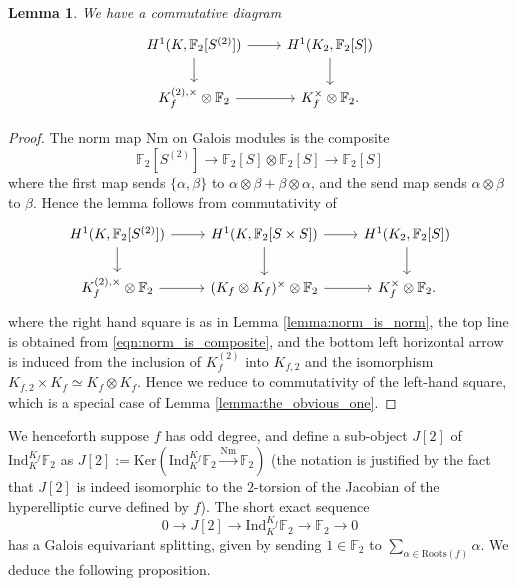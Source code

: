 \documentclass[11pt]{amsart}
\def\F{\mathbb F}
\theoremstyle{plain}
\newtheorem{lemma}{Lemma}
\theoremstyle{definition}
\newcommand{\Roots}{\mathrm{Roots}}
\newcommand{\Ind}{\mathrm{Ind}}
\newcommand{\Nm}{\mathrm{Nm}}
\newcommand{\Ker}{\mathrm{Ker}}
\begin{document}
\begin{lemma}\label{lemma:random}
We have a commutative diagram
\[
\begin{tikzcd}
H^1 (K ,\F _2 [S^{(2)}]) \arrow[r] \arrow[d] & H^1 (K_2 ,\F _2 [S]) \arrow[d] \\
K_f ^{(2),\times } \otimes \F _2  \arrow[r]           & K_{f}^\times \otimes \F _2 .          
\end{tikzcd}
\]
\end{lemma}
\begin{proof}
The norm map $\Nm$ on Galois modules is the composite 
\begin{equation}\label{eqn:norm_is_composite}
\F _2 [S^{(2)}]\to \F _2 [S ]\otimes \F _2 [S] \to \F _2 [S]
\end{equation}
where the first map sends $\{\alpha ,\beta \}$ to $\alpha \otimes \beta +\beta \otimes \alpha $, and the send map sends $\alpha \otimes \beta $ to $\beta $. Hence the lemma follows from commutativity of 
\[
\begin{tikzcd}
H^1 (K ,\F _2 [S^{(2)}]) \arrow[r] \arrow[d] & H^1 (K,\F _2 [S\times S]) \arrow[r] \arrow[d] & H^1 (K_2 ,\F _2 [S]) \arrow[d] \\
K_f ^{(2),\times } \otimes \F _2  \arrow[r] & (K_f \otimes K_f )^\times \otimes \F _2 \arrow[r] & K_{f}^\times \otimes \F _2 .          
\end{tikzcd}
\]
where the right hand square is as in Lemma \ref{lemma:norm_is_norm}, the top line is obtained from \eqref{eqn:norm_is_composite}, and the bottom left horizontal arrow is induced from the inclusion of $K_f ^{(2)}$ into $K_{f,2}$ and the isomorphism $K_{f,2}\times K_f \simeq K_f \otimes K_f $. Hence we reduce to commutativity of the left-hand square, which is a special case of Lemma \ref{lemma:the_obvious_one}.

\end{proof}

We henceforth suppose $f$ has odd degree, and define a sub-object $J[2]$ of $\Ind ^{K_f }_K \F _2 $ as $J[2]:=\Ker (\Ind ^{K_f }_K \F _2 \stackrel{\Nm}{\longrightarrow } \F _2 )$ (the notation is justified by the fact that $J[2]$ is indeed isomorphic to the $2$-torsion of the Jacobian of the hyperelliptic curve defined by $f$). The short exact sequence
\begin{equation}\label{eqn:seq}
0\to J[2]\to \Ind ^{K_f }_K \F _2 \to \F _2  \to 0
\end{equation}
has a Galois equivariant splitting, given by sending $1\in \F _2 $ to $\sum _{\alpha \in \Roots (f)}\alpha $. We deduce the following proposition.
\end{document}
